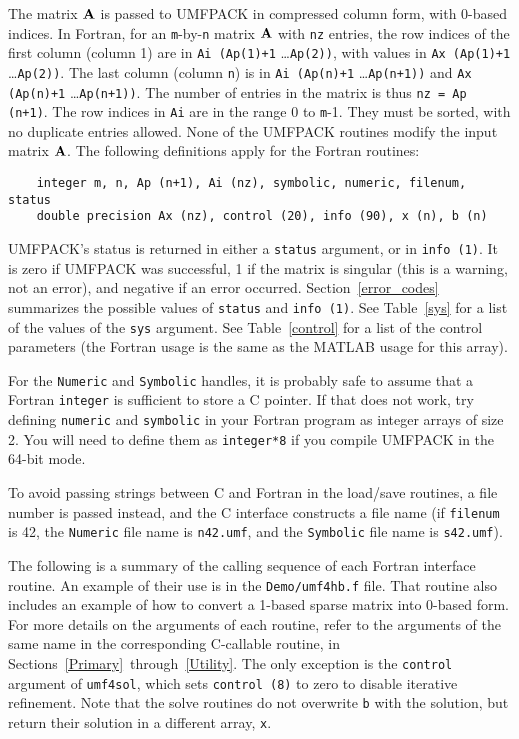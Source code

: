 \documentclass[11pt]{article}
\newcommand{\m}[1]{{\bf{#1}}}       %
\begin{document}
The matrix $\m{A}$ is passed to UMFPACK in compressed column form, with 0-based
indices.  In Fortran, for an {\tt m}-by-{\tt n} matrix $\m{A}$ with {\tt nz}
entries, the row indices of the first column (column 1) are in
{\tt Ai (Ap(1)+1} \ldots {\tt Ap(2))}, with values in
{\tt Ax (Ap(1)+1} \ldots {\tt Ap(2))}.  The last column (column {\tt n}) is in
{\tt Ai (Ap(n)+1} \ldots {\tt Ap(n+1))} and
{\tt Ax (Ap(n)+1} \ldots {\tt Ap(n+1))}.
The number of entries in the matrix is thus {\tt nz = Ap (n+1)}.
The row indices in {\tt Ai} are in the range 0 to {\tt m}-1.  They must be
sorted, with no duplicate entries allowed.  None of the UMFPACK routines
modify the input matrix $\m{A}$.
The following definitions apply for the Fortran routines:

{\footnotesize
\begin{verbatim}
    integer m, n, Ap (n+1), Ai (nz), symbolic, numeric, filenum, status
    double precision Ax (nz), control (20), info (90), x (n), b (n)
\end{verbatim}
}

UMFPACK's status is returned in either a {\tt status} argument, or in
{\tt info (1)}.
It is zero if UMFPACK was successful, 1 if the matrix is singular (this is a
warning, not an error), and negative if an error occurred.
Section~\ref{error_codes} summarizes the possible values of {\tt status}
and {\tt info (1)}.
See Table~\ref{sys} for a list of the values of the {\tt sys} argument.
See Table~\ref{control} for a list of the control parameters (the
Fortran usage is the same as the MATLAB usage for this array).

For the {\tt Numeric} and {\tt Symbolic} handles, it is probably safe to
assume that a Fortran {\tt integer} is sufficient to store a C pointer.  If
that does not work, try defining {\tt numeric} and {\tt symbolic} in your
Fortran program as integer arrays of size 2.  You will need to define them
as {\tt integer*8} if you compile UMFPACK in the 64-bit mode.

To avoid passing strings between C and Fortran in the load/save routines,
a file number is passed instead, and the C interface constructs a file name
(if {\tt filenum} is 42, the {\tt Numeric} file name is {\tt n42.umf}, and
the {\tt Symbolic} file name is {\tt s42.umf}).

The following is a summary of the calling sequence of each Fortran
interface routine.  An example of their use is in the {\tt Demo/umf4hb.f}
file.  That routine also includes an example of how to convert a 1-based
sparse matrix into 0-based form.  For more details on the arguments of each
routine, refer to the arguments of the same name in the corresponding
C-callable routine, in Sections~\ref{Primary}~through~\ref{Utility}.
The only exception is the {\tt control} argument of {\tt umf4sol},
which sets {\tt control (8)} to zero to disable iterative refinement.
Note that the solve routines do not overwrite {\tt b} with the solution,
but return their solution in a different array, {\tt x}.
\end{document}
